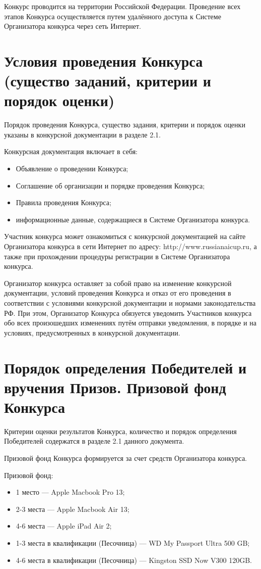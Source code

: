 Конкурс проводится на территории Российской Федерации. Проведение всех этапов Конкурса осуществляется путем удалённого доступа к Системе
Организатора конкурса через сеть Интернет.

\section{Условия проведения Конкурса (существо заданий, критерии и порядок оценки)}

Порядок проведения Конкурса, существо задания, критерии и порядок оценки указаны в конкурсной документации в разделе 2.1.

Конкурсная документация включает в себя:
\begin{itemize}
\item Объявление о проведении Конкурса;
\item Соглашение об организации и порядке проведения Конкурса;
\item Правила проведения Конкурса;
\item информационные данные, содержащиеся в Системе Организатора конкурса.
\end{itemize}

Участник конкурса может ознакомиться с конкурсной документацией на сайте Организатора конкурса в сети Интернет по адресу:
http://www.russianaicup.ru, а также при прохождении процедуры регистрации в Системе Организатора конкурса.

Организатор конкурса оставляет за собой право на изменение конкурсной документации, условий проведения Конкурса и отказ от его проведения в
соответствии с условиями конкурсной документации и нормами законодательства РФ. При этом, Организатор Конкурса обязуется уведомить
Участников конкурса обо всех произошедших изменениях путём отправки уведомления, в порядке и на условиях, предусмотренных в конкурсной
документации.

\section{Порядок определения Победителей и вручения Призов. Призовой фонд Конкурса}

Критерии оценки результатов Конкурса, количество и порядок определения Победителей содержатся в разделе 2.1 данного документа.

Призовой фонд Конкурса формируется за счет средств Организатора конкурса.

Призовой фонд:
\begin{itemize}
\item 1 место --- Apple Macbook Pro 13\textquotedbl;
\item 2-3 места --- Apple Macbook Air 13\textquotedbl;
\item 4-6 места --- Apple iPad Air 2;
\item 1-3 места в квалификации (Песочница) --- WD My Passport Ultra 500 GB;
\item 4-6 места в квалификации (Песочница) --- Kingston SSD Now V300 120GB.
\end{itemize}

